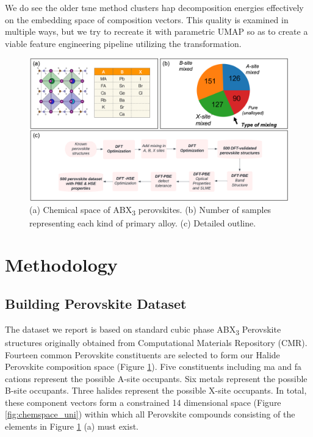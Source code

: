 \documentclass[twoside, twocolumn, 9pt, draft]{article}
\begin{document}
We do see the older \acrshort{tsne} method clusters \acrshort{hap} decomposition energies
effectively on the embedding space of composition vectors. This
quality is examined in multiple ways, but we try to recreate it with
parametric UMAP so as to create a viable feature engineering pipeline
utilizing the transformation.

\begin{figure}
\centering
\includegraphics[h,width=.9\linewidth]{./figs/outline.png}
\caption{\label{fig:outline} (a) Chemical space of ABX\textsubscript{3} perovskites. (b) Number of samples representing each kind of primary alloy. (c) Detailed outline.}
\end{figure}

\section*{Methodology}
\label{sec:org07ee6cc}
\subsection*{Building Perovskite Dataset}
\label{sec:org5584dcb}
The dataset we report is based on standard cubic phase ABX\textsubscript{3}
Perovskite structures originally obtained from Computational Materials
Repository (CMR)\cite{pilania-2016-machin-learn}. Fourteen common
Perovskite constituents are selected to form our Halide Perovskite
composition space (Figure \ref{fig:outline}). Five constituents
including \acrshort{ma} and \acrshort{fa} cations represent the possible A-site
occupants. Six metals represent the possible B-site occupants. Three
halides represent the possible X-site occupants. In total, these
component vectors form a constrained 14 dimensional space (Figure
\ref{fig:chemspace_uni}) within which all Perovskite compounds
consisting of the elements in Figure \ref{fig:outline} (a) must exist.
\end{document}
